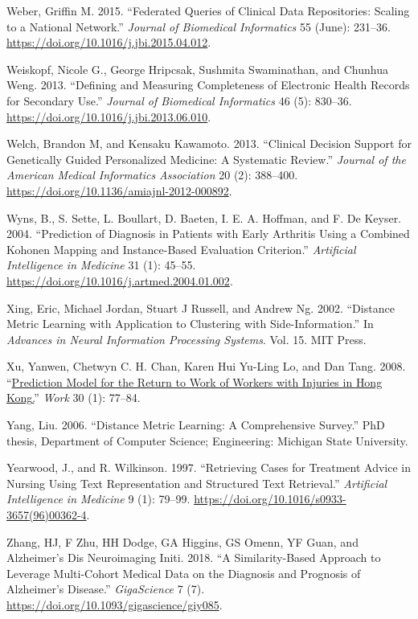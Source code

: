 \documentclass{article}
\newlength{\cslhangindent}
\newlength{\cslentryspacingunit} %
\newenvironment{CSLReferences}[2] %
 {%
  \setlength{\parindent}{0pt}
  \ifodd #1
  \let\oldpar\par
  \def\par{\hangindent=\cslhangindent\oldpar}
  \fi
  \setlength{\parskip}{#2\cslentryspacingunit}
 }%
 {}
\begin{document}
\begin{CSLReferences}{1}{0}
\leavevmode{}%
Weber, Griffin M. 2015. {``Federated Queries of Clinical Data
Repositories: {Scaling} to a National Network.''} \emph{Journal of
Biomedical Informatics} 55 (June): 231--36.
\url{https://doi.org/10.1016/j.jbi.2015.04.012}.

\leavevmode{}%
Weiskopf, Nicole G., George Hripcsak, Sushmita Swaminathan, and Chunhua
Weng. 2013. {``Defining and Measuring Completeness of Electronic Health
Records for Secondary Use.''} \emph{Journal of Biomedical Informatics}
46 (5): 830--36. \url{https://doi.org/10.1016/j.jbi.2013.06.010}.

\leavevmode{}%
Welch, Brandon M, and Kensaku Kawamoto. 2013. {``Clinical Decision
Support for Genetically Guided Personalized Medicine: A Systematic
Review.''} \emph{Journal of the American Medical Informatics
Association} 20 (2): 388--400.
\url{https://doi.org/10.1136/amiajnl-2012-000892}.

\leavevmode{}%
Wyns, B., S. Sette, L. Boullart, D. Baeten, I. E. A. Hoffman, and F. De
Keyser. 2004. {``Prediction of Diagnosis in Patients with Early
Arthritis Using a Combined {Kohonen} Mapping and Instance-Based
Evaluation Criterion.''} \emph{Artificial Intelligence in Medicine} 31
(1): 45--55. \url{https://doi.org/10.1016/j.artmed.2004.01.002}.

\leavevmode{}%
Xing, Eric, Michael Jordan, Stuart J Russell, and Andrew Ng. 2002.
{``Distance {Metric Learning} with {Application} to {Clustering} with
{Side-Information}.''} In \emph{Advances in {Neural Information
Processing Systems}}. Vol. 15. MIT Press.

\leavevmode{}%
Xu, Yanwen, Chetwyn C. H. Chan, Karen Hui Yu-Ling Lo, and Dan Tang.
2008. {``\href{https://www.ncbi.nlm.nih.gov/pubmed/18198444}{Prediction
Model for the Return to Work of Workers with Injuries in {Hong
Kong}.}''} \emph{Work} 30 (1): 77--84.

\leavevmode{}%
Yang, Liu. 2006. {``Distance {Metric Learning}: {A Comprehensive
Survey}.''} PhD thesis, Department of Computer Science; Engineering:
Michigan State University.

\leavevmode{}%
Yearwood, J., and R. Wilkinson. 1997. {``Retrieving Cases for Treatment
Advice in Nursing Using Text Representation and Structured Text
Retrieval.''} \emph{Artificial Intelligence in Medicine} 9 (1): 79--99.
\url{https://doi.org/10.1016/s0933-3657(96)00362-4}.

\leavevmode{}%
Zhang, HJ, F Zhu, HH Dodge, GA Higgins, GS Omenn, YF Guan, and
Alzheimer's Dis Neuroimaging Initi. 2018. {``A Similarity-Based Approach
to Leverage Multi-Cohort Medical Data on the Diagnosis and Prognosis of
{Alzheimer}'s Disease.''} \emph{GigaScience} 7 (7).
\url{https://doi.org/10.1093/gigascience/giy085}.

\end{CSLReferences}



\end{document}
